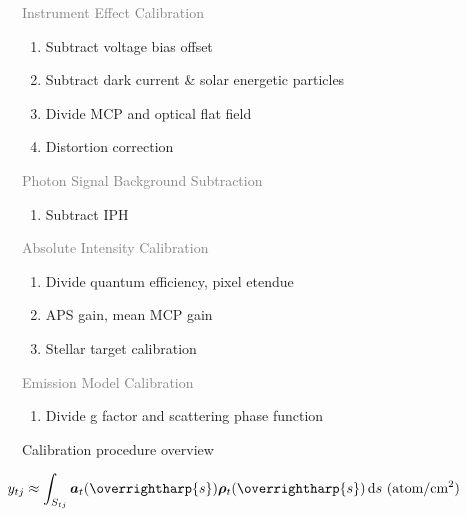 \documentclass[pdflatex,twocolumn,sn-mathphys-num]{sn-jnl}
\newcommand{\vc}[1]{\overrightharp{#1}}
\newcommand{\dif}{\mathop{}\!\mathrm{d}}
\newcommand{\gt}[1]{\textcolor{gray}{#1}}
\begin{document}
\begin{figure}

    \begin{framed}
    \noindent
    \gt{Instrument Effect Calibration}
    \begin{enumerate}
      \setcounter{enumi}{\value{calstep}}
      \item Subtract voltage bias offset
      \item Subtract dark current \& solar energetic particles
      \item Divide MCP and optical flat field
      \item Distortion correction
      \setcounter{calstep}{\value{enumi}}
    \end{enumerate}

    \noindent
    \gt{Photon Signal Background Subtraction}
    \begin{enumerate}
      \setcounter{enumi}{\value{calstep}}
      \item Subtract IPH
      \setcounter{calstep}{\value{enumi}}
    \end{enumerate}

    \noindent
    \gt{Absolute Intensity Calibration}
    \begin{enumerate}
      \setcounter{enumi}{\value{calstep}}
      \item Divide quantum efficiency, pixel etendue
      \item APS gain, mean MCP gain
      \item Stellar target calibration
      \setcounter{calstep}{\value{enumi}}
    \end{enumerate}

    \noindent
    \gt{Emission Model Calibration}
    \begin{enumerate}
      \setcounter{enumi}{\value{calstep}}
      \item Divide g factor and scattering phase function
      \setcounter{calstep}{\value{enumi}}
    \end{enumerate}
    \end{framed}

  \caption{Calibration procedure overview}
  \label{fig:procedure}
\end{figure}



    \begin{equation}
        y_{t j} \approx \int_{S_{t j}} \bm{a}_t (\vc{s}) \bm{\rho}_t (\vc{s}) \dif s \text{  (atom/cm$^2$)}
    \end{equation}
\end{document}
